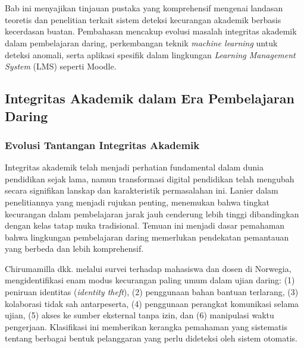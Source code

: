 \chapter{\babDua}
\label{bab:2}

Bab ini menyajikan tinjauan pustaka yang komprehensif mengenai landasan teoretis dan penelitian terkait sistem deteksi kecurangan akademik berbasis kecerdasan buatan. Pembahasan mencakup evolusi masalah integritas akademik dalam pembelajaran daring, perkembangan teknik \textit{machine learning} untuk deteksi anomali, serta aplikasi spesifik dalam lingkungan \textit{Learning Management System} (LMS) seperti Moodle.

\section{Integritas Akademik dalam Era Pembelajaran Daring}
\label{sec:integritasAkademik}

\subsection{Evolusi Tantangan Integritas Akademik}
\label{subsec:evolusiTantangan}

Integritas akademik telah menjadi perhatian fundamental dalam dunia pendidikan sejak lama, namun transformasi digital pendidikan telah mengubah secara signifikan lanskap dan karakteristik permasalahan ini. Lanier \cite{Lanier2006} dalam penelitiannya yang menjadi rujukan penting, menemukan bahwa tingkat kecurangan dalam pembelajaran jarak jauh cenderung lebih tinggi dibandingkan dengan kelas tatap muka tradisional. Temuan ini menjadi dasar pemahaman bahwa lingkungan pembelajaran daring memerlukan pendekatan pemantauan yang berbeda dan lebih komprehensif.

Chirumamilla dkk. \cite{Chirumamilla2020} melalui survei terhadap mahasiswa dan dosen di Norwegia, mengidentifikasi enam modus kecurangan paling umum dalam ujian daring: (1) peniruan identitas (\textit{identity theft}), (2) penggunaan bahan bantuan terlarang, (3) kolaborasi tidak sah antarpeserta, (4) penggunaan perangkat komunikasi selama ujian, (5) akses ke sumber eksternal tanpa izin, dan (6) manipulasi waktu pengerjaan. Klasifikasi ini memberikan kerangka pemahaman yang sistematis tentang berbagai bentuk pelanggaran yang perlu dideteksi oleh sistem otomatis.

